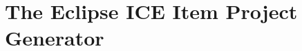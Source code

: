 \documentclass{report}
\begin{document}
\chapter{The Eclipse ICE Item Project Generator}

\end{document}
